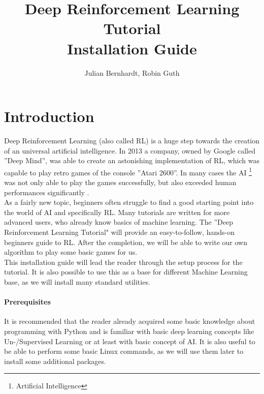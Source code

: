 \documentclass[a4paper]{article}
\title{Deep Reinforcement Learning Tutorial \\Installation Guide}
\author{Julian Bernhardt, Robin Guth}
\begin{document}
\maketitle
\tableofcontents

\section{Introduction}
Deep Reinforcement Learning (also called RL) is a huge step towards the creation of an universal artificial intelligence. In 2013 a company, owned by Google called ''Deep Mind'', was able to create an astonishing implementation of RL, which was capable to play retro games of the console ''Atari 2600''. In many cases the AI \footnote{Artificial Intelligence} was not only able to play the games successfully, but also exceeded human performances significantly \cite{atari}.\\
As a fairly new topic, beginners often struggle to find a good starting point into the world of AI and specifically RL. Many tutorials are written for more advanced users, who already know basics of machine learning. The ''Deep Reinforcement Learning Tutorial" will provide an easy-to-follow, hands-on beginners guide to RL. After the completion, we will be able to write our own algorithm to play some basic games for us.\\
This installation guide will lead the reader through the setup process for the tutorial. It is also possible to use this as a base for different Machine Learning base, as we will install many standard utilities.
\paragraph{Prerequisites}
It is recommended that the reader already acquired some basic knowledge about programming with Python and is familiar with basic deep learning concepts like Un-/Supervised Learning or at least with basic concept of AI. It is also useful to be able to perform some basic Linux commands, as we will use them later to install some additional packages.
\end{document}
